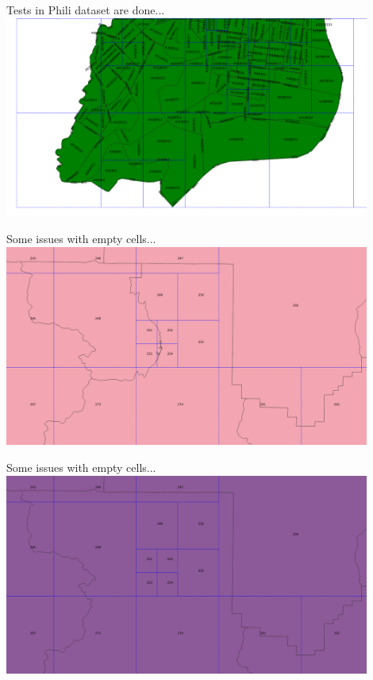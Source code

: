 \documentclass{beamer}
\begin{document}
\begin{frame}{Tests in Phili dataset are done...}
	\centering
	\includegraphics[trim=1cm 0 1cm 0, clip, width=0.9\textwidth]{figures/DCELM.png}
\end{frame}

\begin{frame}{Some issues with empty cells...}
	\centering
	\includegraphics[trim=1cm 0 1cm 0, clip, width=0.9\textwidth]{figures/EmptyCells1}
\end{frame}

\begin{frame}{Some issues with empty cells...}
	\centering
	\includegraphics[trim=1cm 0 1cm 0, clip, width=0.9\textwidth]{figures/EmptyCells2}
\end{frame}
\end{document}
